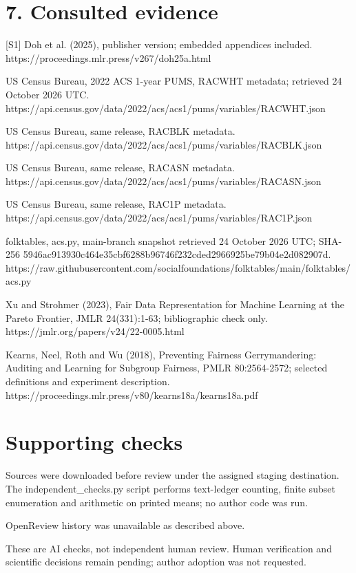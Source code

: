 \documentclass[10pt]{article}
\begin{document}
\section*{7. Consulted evidence}
[S1] Doh et al. (2025), publisher version; embedded appendices included.
https://proceedings.mlr.press/v267/doh25a.html\par
[S2] US Census Bureau, 2022 ACS 1-year PUMS, RACWHT metadata; retrieved 24 October 2026 UTC.
https://api.census.gov/data/2022/acs/acs1/pums/variables/RACWHT.json\par
[S3] US Census Bureau, same release, RACBLK metadata.
https://api.census.gov/data/2022/acs/acs1/pums/variables/RACBLK.json\par
[S4] US Census Bureau, same release, RACASN metadata.
https://api.census.gov/data/2022/acs/acs1/pums/variables/RACASN.json\par
[S5] US Census Bureau, same release, RAC1P metadata.
https://api.census.gov/data/2022/acs/acs1/pums/variables/RAC1P.json\par
[S6] folktables, acs.py, main-branch snapshot retrieved 24 October 2026 UTC; SHA-256 5946ac913930c464e35cbf6288b96746f232cded2966925be79b04e2d082907d.
https://raw.githubusercontent.com/socialfoundations/folktables/main/folktables/acs.py\par
[S7] Xu and Strohmer (2023), Fair Data Representation for Machine Learning at the Pareto Frontier, JMLR 24(331):1-63; bibliographic check only.
https://jmlr.org/papers/v24/22-0005.html\par
[S8] Kearns, Neel, Roth and Wu (2018), Preventing Fairness Gerrymandering: Auditing and Learning for Subgroup Fairness, PMLR 80:2564-2572; selected definitions and experiment description.
https://proceedings.mlr.press/v80/kearns18a/kearns18a.pdf\par
\section*{Supporting checks}
Sources were downloaded before review under the assigned staging destination. The independent\_checks.py script performs text-ledger counting, finite subset enumeration and arithmetic on printed means; no author code was run.\par
OpenReview history was unavailable as described above.\par
These are AI checks, not independent human review. Human verification and scientific decisions remain pending; author adoption was not requested.\par
\end{document}
